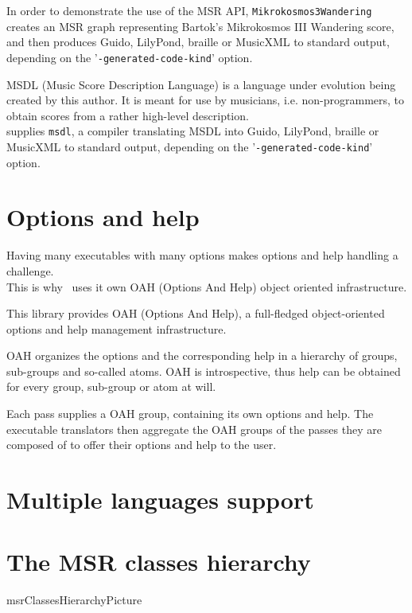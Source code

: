 \documentclass[12pt,a4paper]{article}
\begin{document}



In order to demonstrate the use of the MSR API, {\tt Mikrokosmos3Wandering} creates an MSR graph representing Bartok's Mikrokosmos III Wandering score, and then produces Guido, LilyPond, braille or MusicXML to standard output, depending on the '{\tt -generated-code-kind}' option.

MSDL (Music Score Description Language) is a language under evolution being created by this author. It is meant for use by musicians, i.e. non-programmers, to obtain scores from a rather high-level description.\\
\lib supplies {\tt msdl}, a compiler translating MSDL into Guido, LilyPond, braille or MusicXML to standard output, depending on the '{\tt -generated-code-kind}' option.


\section{Options and help}

Having many executables with many options makes options and help handling a challenge.\\
This is why \lib\ uses it own OAH (Options And Help) object oriented infrastructure.

This library provides OAH (Options And Help), a full-fledged object-oriented options and help management infrastructure.

OAH organizes the options and the corresponding help in a hierarchy of groups, sub-groups and so-called atoms. OAH is introspective, thus help can be obtained for every group, sub-group or atom at will.

Each pass supplies a OAH group, containing its own options and help. The executable translators then aggregate the OAH groups of the passes they are composed of to offer their options and help to the user.


\section{Multiple languages support}


\section{The MSR classes hierarchy}


 {msrClassesHierarchyPicture}



\end{document}
